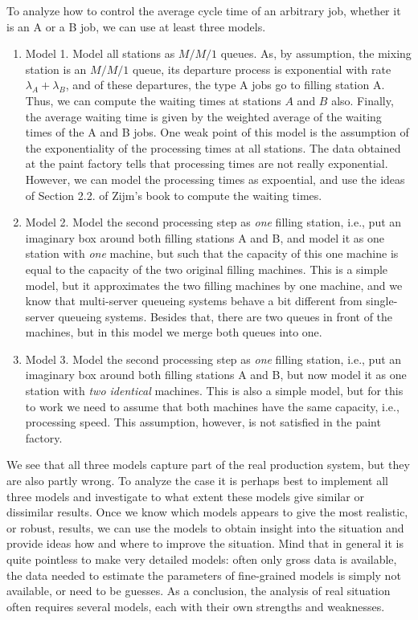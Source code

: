 To analyze how to control the average cycle time of an arbitrary job,
whether it is an A or a B job, we can use at least three models.
\begin{enumerate}
\item Model 1. Model all stations as $M/M/1$ queues. As, by
  assumption, the mixing station is an $M/M/1$ queue, its departure
  process is exponential with rate $\lambda_A + \lambda_B$, and of
  these departures, the type A jobs go to filling station A. Thus, we
  can compute the waiting times at stations $A$ and $B$ also. Finally,
  the average waiting time is given by the weighted average of the
  waiting times of the A and B jobs. One weak point of this model is
  the assumption of the exponentiality of the processing times at all
  stations. The data obtained at the paint factory tells that
  processing times are not really exponential.  However, we can model
  the processing times as expoential, and use the ideas of Section
  2.2. of Zijm's book to compute the waiting times.
\item Model 2. Model the second processing step as \emph{one} filling
  station, i.e., put an imaginary box around both filling stations A
  and B, and model it as one station with \emph{one} machine, but such
  that the capacity of this one machine is equal to the capacity of
  the two original filling machines. This is a simple model, but it
  approximates the two filling machines by one machine, and we know
  that multi-server queueing systems behave a bit different from
  single-server queueing systems. Besides that, there are two queues
  in front of the machines, but in this model we merge both queues
  into one.
\item Model 3. Model the second processing step as \emph{one} filling
  station, i.e., put an imaginary box around both filling stations A
  and B, but now model it as one station with \emph{two identical}
  machines.  This is also a simple model, but for this to work we need
  to assume that both machines have the same capacity, i.e.,
  processing speed. This assumption, however, is not satisfied in the
  paint factory.
\end{enumerate}

We see that all three models capture part of the real production
system, but they are also partly wrong.  To analyze the case it is
perhaps best to implement all three models and investigate to what
extent these models give similar or dissimilar results. Once we know
which models appears to give the most realistic, or robust, results,
we can use the models to obtain insight into the situation and provide
ideas how and where to improve the situation. Mind that in general it
is quite pointless to make very detailed models: often only gross data
is available, the data needed to estimate the parameters of
fine-grained models is simply not available, or need to be guesses.
As a conclusion, the analysis of real situation often requires several
models, each with their own strengths and weaknesses.


